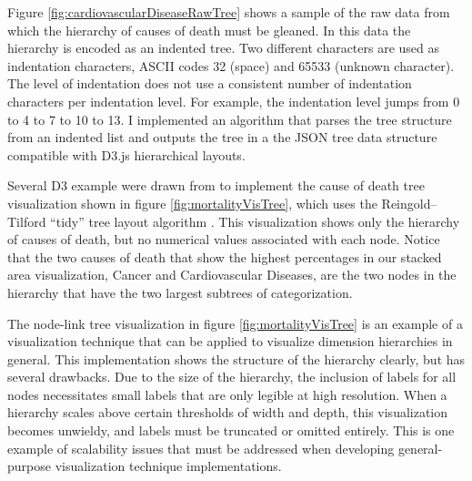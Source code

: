 \documentclass[12pt]{article}
\begin{document}
\begin{doublespace}
Figure \ref{fig:cardiovascularDiseaseRawTree} shows a sample of the raw data from which the hierarchy of causes of death must be gleaned. In this data the hierarchy is encoded as an indented tree. Two different characters are used as indentation characters, ASCII codes 32 (space) and 65533 (unknown character). The level of indentation does not use a consistent number of indentation characters per indentation level. For example, the indentation level jumps from 0 to 4 to 7 to 10 to 13. I implemented an algorithm that parses the tree structure from an indented list and outputs the tree in a the JSON tree data structure compatible with D3.js hierarchical layouts.

Several D3 example were drawn from to implement the cause of death tree visualization shown in figure \ref{fig:mortalityVisTree}, which uses the Reingold–Tilford ``tidy'' tree layout algorithm \cite{reingold1981tidier}. This visualization shows only the hierarchy of causes of death, but no numerical values associated with each node. Notice that the two causes of death that show the highest percentages in our stacked area visualization, Cancer and Cardiovascular Diseases, are the two nodes in the hierarchy that have the two largest subtrees of categorization.

The node-link tree visualization in figure \ref{fig:mortalityVisTree} is an example of a visualization technique that can be applied to visualize dimension hierarchies in general. This implementation shows the structure of the hierarchy clearly, but has several drawbacks. Due to the size of the hierarchy, the inclusion of labels for all nodes necessitates small labels that are only legible at high resolution. When a hierarchy scales above certain thresholds of width and depth, this visualization becomes unwieldy, and labels must be truncated or omitted entirely. This is one example of scalability issues that must be addressed when developing general-purpose visualization technique implementations.


\end{doublespace}
\end{document}
